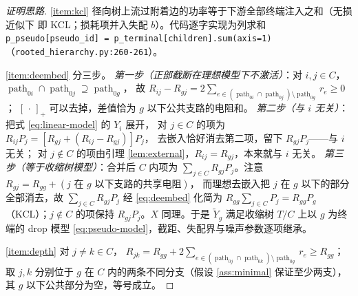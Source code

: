 \documentclass[UTF8,11pt]{ctexart}
\begin{document}
\begin{proof}[证明思路]
\ref{item:kcl} 径向树上流过附着边的功率等于下游全部终端注入之和（无损近似下
即 KCL；损耗项并入失配 $b$）。代码逐字实现为列求和
\texttt{p\_pseudo[pseudo\_id] = p\_terminal[children].sum(axis=1)}
（\texttt{rooted\_hierarchy.py:260-261}）。

\ref{item:deembed} 分三步。
\emph{第一步（正部截断在理想模型下不激活）}：对 $i,j\in C$，
$\operatorname{path}_{0i}\cap\operatorname{path}_{0j}\supseteq\operatorname{path}_{0g}$，
故 $R_{ij}-R_{gj}=2\sum_{e\in(\operatorname{path}_{0i}\cap\operatorname{path}_{0j})
\setminus\operatorname{path}_{0g}} r_e\ge 0$；
$[\,\cdot\,]_{+}$ 可以去掉，差值恰为 $g$ 以下公共支路的电阻和。
\emph{第二步（与 $i$ 无关）}：把式 \eqref{eq:linear-model} 的 $Y_i$ 展开，
对 $j\in C$ 的项为 $R_{ij}P_j=[R_{gj}+(R_{ij}-R_{gj})]P_j$，
去嵌入恰好消去第二项，留下 $R_{gj}P_j$——与 $i$ 无关；
对 $j\notin C$ 的项由引理 \ref{lem:external}，$R_{ij}=R_{gj}$，本来就与 $i$ 无关。
\emph{第三步（等于收缩树模型）}：合并后 $C$ 内项为
$\sum_{j\in C}R_{gj}P_j$。注意 $R_{gj}=R_{gg}+(\text{$j$ 在 $g$ 以下支路的共享电阻})$，
而理想去嵌入把 $j$ 在 $g$ 以下的部分全部消去，故
$\sum_{j\in C}R_{gj}P_j$ 经 \eqref{eq:deembed} 化简为
$R_{gg}\sum_{j\in C}P_j=R_{gg}P_g$（KCL）；$j\notin C$ 的项保持
$R_{gj}P_j$。$X$ 同理。于是 $\widetilde Y_g$ 满足收缩树 $T/C$ 上以 $g$ 为终端的
drop 模型 \eqref{eq:pseudo-model}，截距、失配界与噪声参数逐项继承。

\ref{item:depth} 对 $j\neq k\in C$，
$R_{jk}=R_{gg}+2\sum_{e\in(\operatorname{path}_{0j}\cap\operatorname{path}_{0k})
\setminus\operatorname{path}_{0g}}r_e\ge R_{gg}$；
取 $j,k$ 分别位于 $g$ 在 $C$ 内的两条不同分支（假设 \ref{ass:minimal} 保证至少两支），
其 $g$ 以下公共部分为空，等号成立。
\end{proof}
\end{document}
